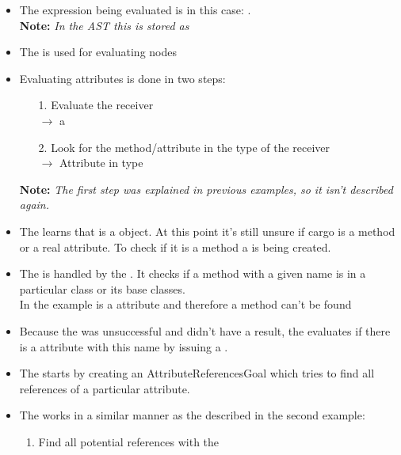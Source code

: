 \documentclass[12pt,halfparskip,DIV11,BCOR10mm]{scrreprt}
\begin{document}
\begin{itemize}
    \item The expression being evaluated is in this case: . \\
          \textbf{Note:} \emph{In the AST this is stored as }
    \item The  is used for evaluating  nodes
    \item Evaluating attributes is done in two steps:
    \begin{itemize}
        \item[1.] Evaluate the receiver \\$\rightarrow$ a
        \item[2.] Look for the method/attribute in the type of the receiver \\ $\rightarrow$ Attribute  in type 
    \end{itemize}
    \item[] \textbf{Note:} \emph{The first step was explained in previous examples, so it isn't described again.}
    \item The  learns that  is a  object. At this point it's still unsure if cargo is a method or a real attribute. To check if it is a method a  is being created.
    \item The  is handled by the . It checks if a method with a given name is in a particular class or its base classes.\\
          In the example  is a attribute and therefore a method can't be found
    \item Because the  was unsuccessful and didn't have a result, the  evaluates if there is a attribute with this name by issuing a .
    \item The  starts by creating an {AttributeReferencesGoal} which tries to find all references of a particular attribute.
    \item The  works in a similar manner as the  described in the second example:
    \begin{enumerate}
        \item Find all potential references with the 

\end{enumerate}
\end{itemize}
\end{document}
